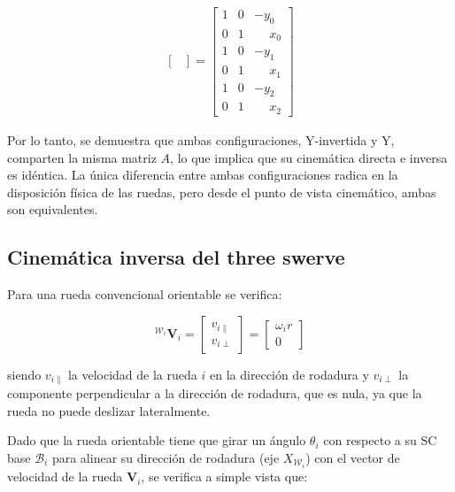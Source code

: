 \documentclass[11pt,a4paper]{article}
\newcommand{\vect}[1]{\bm{#1}}       %
\newcommand{\frameBi}{\mathcal{B}_i}
\newcommand{\frameWi}{\mathcal{W}_i}
\begin{document}
\begin{equation}
\begin{aligned}
\begin{bmatrix}
              \end{bmatrix} = \begin{bmatrix}
                                  1 & 0 & -y_0           \\
                                  0 & 1 & \phantom{-}x_0 \\
                                  1 & 0 & -y_1           \\
                                  0 & 1 & \phantom{-}x_1 \\
                                  1 & 0 & -y_2           \\
                                  0 & 1 & \phantom{-}x_2
                              \end{bmatrix}
    \end{aligned}
\end{equation}

Por lo tanto, se demuestra que ambas configuraciones, Y-invertida y Y, comparten la misma matriz \(A\), lo que implica que su cinemática directa e inversa es idéntica. La única diferencia entre ambas configuraciones radica en la disposición física de las ruedas, pero desde el punto de vista cinemático, ambas son equivalentes.

\subsection{Cinemática inversa del three swerve}

Para una rueda convencional orientable se verifica:

\begin{equation}
    {}^{\frameWi}\vect{V}_{i} = \begin{bmatrix}
        v_{i\parallel} \\
        v_{i\perp}
    \end{bmatrix} = \begin{bmatrix}
        \omega_i r \\
        0
    \end{bmatrix}
\end{equation}

siendo \(v_{i\parallel}\) la velocidad de la rueda \(i\) en la dirección de rodadura y \(v_{i\perp}\) la componente perpendicular a la dirección de rodadura, que es nula, ya que la rueda no puede deslizar lateralmente.

Dado que la rueda orientable tiene que girar un ángulo \(\theta_i\) con respecto a su SC base \(\frameBi\) para alinear su dirección de rodadura (eje \(X_{\frameWi}\)) con el vector de velocidad de la rueda \(\vect{V}_i\), se verifica a simple vista que:
\end{document}
